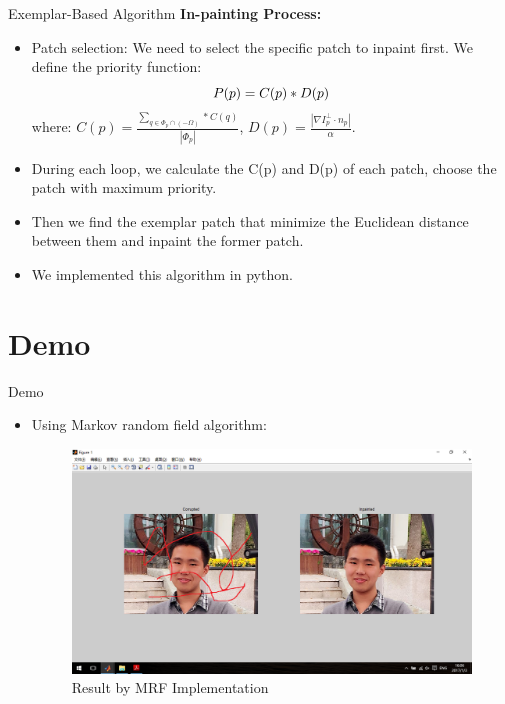 \documentclass{beamer}
\begin{document}
\begin{frame}{Exemplar-Based Algorithm}
	\textbf{In-painting Process:}
	\begin{itemize}[<+->]
		\item Patch selection: We need to select the specific patch to inpaint first. We define the priority function:
		\begin{equation*}
		\centering
		P(p)=C(p)*D(p)
		\nonumber
		\end{equation*}
		where: $C(p)=\frac{\sum_{q\in \Phi _p\cap(-\Omega)}*C(q)}{|\Phi_p|}$, $D(p)=\frac{|\nabla I^\bot_p \cdot n_p|}{\alpha}$.
		\item During each loop, we calculate the C(p) and D(p) of each patch, choose the patch with maximum priority.
		\item Then we find the exemplar patch that minimize the Euclidean distance between them and inpaint the former patch.
		\item We implemented this algorithm in python.
	\end{itemize}
\end{frame}


\section{Demo}
\begin{frame}{Demo}
	\begin{itemize}
		\item Using Markov random field algorithm:
		\begin{figure}
			\centering
			\includegraphics[width=1.0\linewidth]{rmf_result.png}
			\caption{Result by MRF Implementation}
		\end{figure}
	\end{itemize}
\end{frame}
\end{document}
